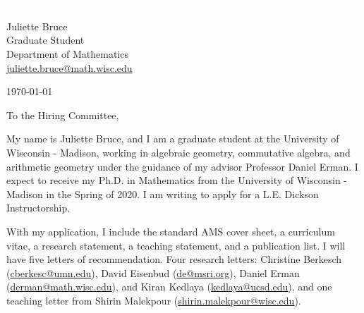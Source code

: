 \documentclass[11pt]{article}
\begin{document}
\section*{}

\noindent
\begin{minipage}{0.99\textwidth}
\begin{minipage}{0.69\textwidth}
\textcolor{white}{.}
\end{minipage}
\begin{minipage}{0.29\textwidth}
{
Juliette Bruce \\
Graduate Student \\
Department of Mathematics \\
\href{mailto:juliette.bruce@math.wisc.edu}{juliette.bruce@math.wisc.edu}
}

\vspace{12pt}
\today
\end{minipage}
\end{minipage}


\vspace{12pt}
\noindent
To the Hiring Committee,

My name is Juliette Bruce, and I am a graduate student at the University of Wisconsin - Madison, working in algebraic geometry, commutative algebra, and arithmetic geometry under the guidance of my advisor Professor Daniel Erman. I expect to receive my Ph.D. in Mathematics from the University of Wisconsin - Madison in the Spring of 2020. I am writing to apply for a L.E. Dickson Instructorship.

With my application, I include the standard AMS cover sheet, a curriculum vitae, a research statement, a teaching statement, and a publication list. I will have five letters of recommendation. Four research letters: Christine Berkesch (\href{mailto:cberkesc@umn.edu}{cberkesc@umn.edu}), David Eisenbud (\href{mailto:de@msri.org}{de@msri.org}), Daniel Erman (\href{mailto:derman@math.wisc.edu}{derman@math.wisc.edu}), and Kiran Kedlaya (\href{mailto:kedlaya@ucsb.edu}{kedlaya@ucsd.edu}), and one teaching letter from Shirin Malekpour (\href{mailto:shirin.malekpour@wisc.edu}{shirin.malekpour@wisc.edu}).
\end{document}
